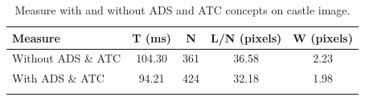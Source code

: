 \documentclass[11pt]{article}
\begin{document}
\begin{longtable}[]{@{}l|cccc@{}}
\toprule
Measure & T (ms) & N & L/N (pixels) & W (pixels)\tabularnewline
\midrule
Without ADS \& ATC & 104.30 & 361 & 36.58 & 2.23\tabularnewline
With ADS \& ATC & 94.21 & 424 & 32.18 & 1.98\tabularnewline
\bottomrule

\caption{Measure with and without ADS and ATC concepts on castle
image.}
\label{tab:castle}
\end{longtable}




\end{document}

